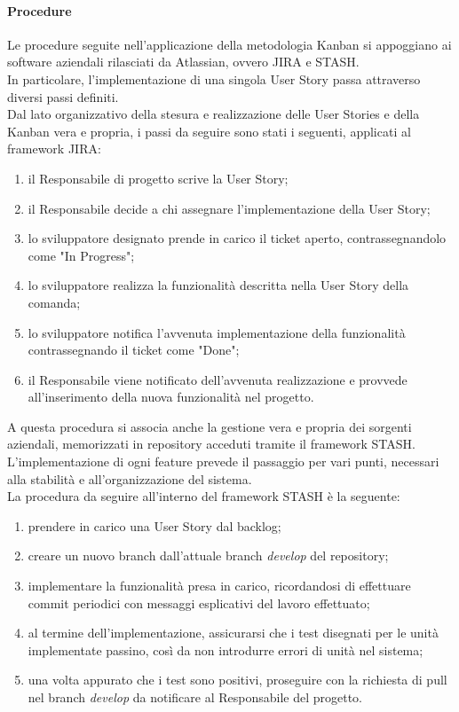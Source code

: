 \paragraph{Procedure}
Le procedure seguite nell'applicazione della metodologia Kanban si appoggiano ai software aziendali rilasciati da Atlassian, ovvero JIRA e STASH.\\
In particolare, l'implementazione di una singola User Story passa attraverso diversi passi definiti.\\
Dal lato organizzativo della stesura e realizzazione delle User Stories e della Kanban vera e propria, i passi da seguire sono stati i seguenti, applicati al framework JIRA:
\begin{enumerate}
	\item il Responsabile di progetto scrive la User Story;
	\item il Responsabile decide a chi assegnare l'implementazione della User Story;
	\item lo sviluppatore designato prende in carico il ticket aperto, contrassegnandolo come "In Progress";
	\item lo sviluppatore realizza la funzionalità descritta nella User Story della comanda;
	\item lo sviluppatore notifica l'avvenuta implementazione della funzionalità contrassegnando il ticket come "Done";
	\item il Responsabile viene notificato dell'avvenuta realizzazione e provvede all'inserimento della nuova funzionalità nel progetto.
\end{enumerate}
A questa procedura si associa anche la gestione vera e propria dei sorgenti aziendali, memorizzati in repository acceduti tramite il framework STASH. L'implementazione di ogni feature prevede il passaggio per vari punti, necessari alla stabilità e all'organizzazione del sistema.\\
La procedura da seguire all'interno del framework STASH è la seguente:
\begin{enumerate}
	\item prendere in carico una User Story dal backlog;
	\item creare un nuovo branch dall'attuale branch \emph{develop} del repository;
	\item implementare la funzionalità presa in carico, ricordandosi di effettuare commit periodici con messaggi esplicativi del lavoro effettuato;
	\item al termine dell'implementazione, assicurarsi che i test disegnati per le unità implementate passino, così da non introdurre errori di unità nel sistema;
	\item una volta appurato che i test sono positivi, proseguire con la richiesta di pull nel branch \emph{develop} da notificare al Responsabile del progetto.
\end{enumerate}
